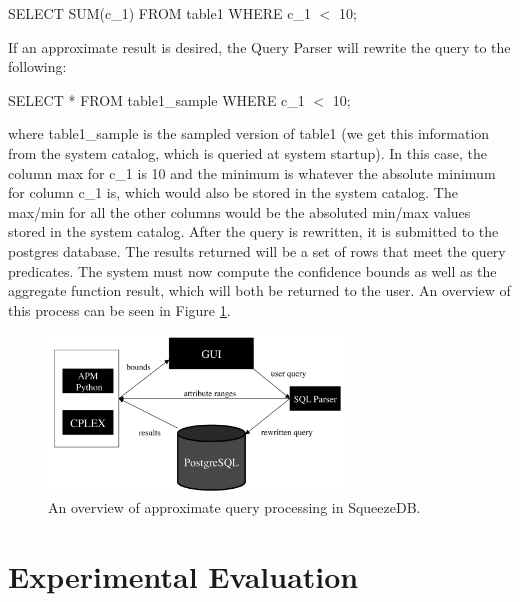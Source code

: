 \documentclass[11pt]{article}
\begin{document}
\begin{center}
SELECT SUM(c\_1) FROM table1 WHERE c\_1 $<$ 10; 
\end{center}

\noindent If an approximate result is desired, the Query Parser will
rewrite the query to the following: 

\begin{center}
SELECT * FROM table1\_sample WHERE c\_1 $<$ 10; 
\end{center}

\noindent where table1\_sample is the sampled version of table1 (we get
this information from the system catalog, which is queried at system
startup). In this case, the column max for c\_1 is 10 and the minimum
is whatever the absolute minimum for column c\_1 is, which would also
be stored in the system catalog. The max/min for all the other columns
would be the absoluted min/max values stored in the system
catalog. After the query is rewritten, it is submitted to the postgres
database. The results returned will be a set of rows that meet the
query predicates. The system must now compute the confidence bounds as
well as the aggregate function result, which will both be returned to
the user. An overview of this process can be seen in Figure
\ref{fig:overview}. 

\begin{figure}
\centering
\includegraphics[width=0.7\textwidth]{overview}
\caption{An overview of approximate query processing in SqueezeDB.}
\label{fig:overview}
\end{figure}

\section{Experimental Evaluation}
\end{document}
